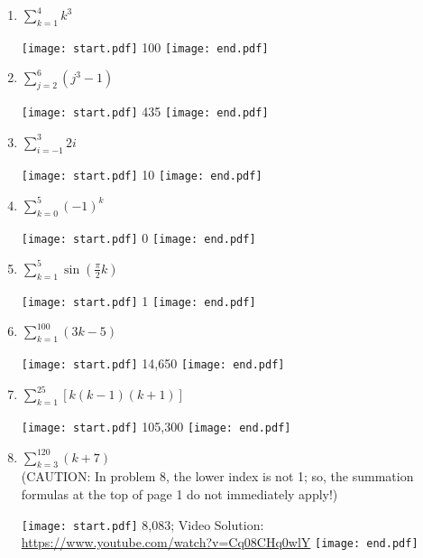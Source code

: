 \documentclass[12pt]{article}
\begin{document}
\begin{enumerate}

\item $\sum\limits_{k=1}^{4}k^3$ 

\texttt{[image: start.pdf]}
{{100}}
\texttt{[image: end.pdf]}


\item $\sum\limits_{j=2}^{6} (j^3-1)$ 

\texttt{[image: start.pdf]}
{{435}}
\texttt{[image: end.pdf]}


\item $\sum_{i=-1}^3{2i}$

\texttt{[image: start.pdf]}
{{10}}
\texttt{[image: end.pdf]}


\item $\sum_{k=0}^5{(-1)^k}$

\texttt{[image: start.pdf]}
{{0}}
\texttt{[image: end.pdf]}


\item $\sum_{k=1}^5{\sin{\left(\frac{\pi}{2}k\right)}}$

\texttt{[image: start.pdf]}
{{1}}
\texttt{[image: end.pdf]}


\end{enumerate}


\begin{enumerate}
\setcounter{enumi}{5}

\item $\sum_{k=1}^{100}{(3k-5)}$

\texttt{[image: start.pdf]}
{{14,650}}
\texttt{[image: end.pdf]}


\item $\sum\limits_{k=1}^{25}[ k(k-1)(k+1)]$ 

\texttt{[image: start.pdf]}
{{105,300}}
\texttt{[image: end.pdf]}


\item $\sum_{k=3}^{120}{(k+7)}$\\

(CAUTION: In problem 8, the lower index is not 1; so, the summation formulas at the top of page 1 do not immediately apply!)

\texttt{[image: start.pdf]}
{{8,083; Video Solution: \textcolor{blue}{\href{https://www.youtube.com/watch?v=Cq08CHq0wlY}{https://www.youtube.com/watch?v=Cq08CHq0wlY}}}}
\texttt{[image: end.pdf]}


\end{enumerate}
\end{document}

